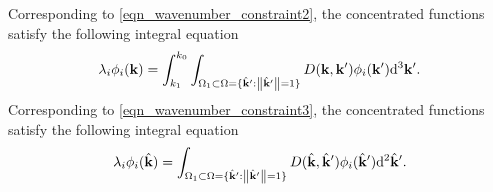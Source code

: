 \documentclass[12pt,draftclsnofoot,journal,onecolumn]{IEEEtran}
\begin{document}
Corresponding to \eqref{eqn_wavenumber_constraint2}, the concentrated functions satisfy the following integral equation
\begin{equation}
	\lambda_i \phi_i({\bf k}) = \int_{k_1}^{k_0}\int_{{\Omega}_1 \subset {\Omega}=\{\hat{\bf k}': \left\| \hat{\bf k}' \right\|=1\}} D({\bf k},{\bf k}')\phi_i({\bf k}'){\rm d}^3{\bf k}'.
\end{equation}
Corresponding to \eqref{eqn_wavenumber_constraint3}, the concentrated functions satisfy the following integral equation
\begin{equation}
	\lambda_i \phi_i(\hat{\bf k}) = \int_{{\Omega}_1 \subset {\Omega}=\{\hat{\bf k}': \left\| \hat{\bf k}' \right\|=1\}} D(\hat{\bf k},\hat{\bf k}')\phi_i(\hat{\bf k}'){\rm d}^2\hat{\bf k}'.
\end{equation}
	
%	
	
\end{document}
